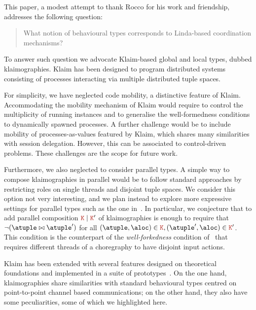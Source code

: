 

This paper, a modest attempt to thank Rocco for his work and
friendship, addresses the following question:
%
\begin{quote}
  What notion of behavioural types corresponds to Linda-based
  coordination mechanisms?
\end{quote}
%
To answer such question we advocate Klaim-based global and local
types, dubbed klaimographies.
%
Klaim has been designed to program distributed systems consisting of
processes interacting via multiple distributed tuple spaces.

For simplicity, we have neglected code mobility, a distinctive feature
of Klaim.
%
Accommodating the mobility mechanism of Klaim would require to control
the multiplicity of running instances and to generalise the
well-formedness conditions to dynamically spawned processes.
%
A further challenge would be to include mobility of
processes-as-values featured by Klaim, which shares many
similarities with session delegation.
%
However, this can be associated to control-driven problems.
%
These challenges are the scope for future work.

Furthermore, we also neglected to consider parallel types.
%
A simple way to compose klaimographies in parallel would be to follow standard
approaches by restricting roles on single threads and disjoint tuple
spaces.
%
We consider this option not very interesting, and we plan 
instead to explore more expressive
settings for parallel types such as the one in~\cite{gt16,gt17}.
%
In particular, we conjecture that to add parallel composition
$\aK \mid \aK'$ of klaimographies is enough to require that
$\neg(\atuple \matches \atuple')$ for all
$(\atuple, \aloc) \in \aK, (\atuple', \aloc) \in \aK'$.
%
This condition is the counterpart of the \emph{well-forkedness}
condition of~\cite{gt16,gt17} that requires different threads of
a choregraphy to have disjoint input actions.

Klaim has been extended with several features designed on theoretical
foundations and implemented in a suite of
prototypes~\cite{klaim}.
%
On the one hand, klaimographies share similarities with standard
behavioural types centred on point-to-point channel based
communications; on the other hand, they also have some peculiarities,
some of which we highlighted here.

